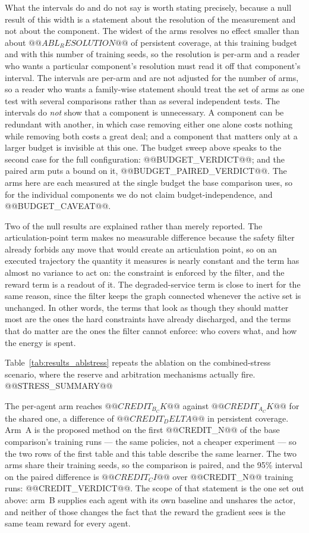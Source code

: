 What the intervals do and do not say is worth stating precisely, because a
null result of this width is a statement about the resolution of the
measurement and not about the component.  The widest of the arms resolves no effect smaller than about $@@ABL_RESOLUTION@@$ of persistent coverage, at this training budget and with this number of training seeds, so the resolution is per-arm and a reader who wants a particular component's resolution must read it off that component's interval.  The
intervals are per-arm and are not adjusted for the number of arms, so a
reader who wants a family-wise statement should treat the set of arms as
one test with several comparisons rather than as several independent
tests.  The intervals do \emph{not} show that a component is unnecessary.
A component can be redundant with another, in which case removing either
one alone costs nothing while removing both costs a great deal; and a
component that matters only at a larger budget is invisible at this one.
The budget sweep above speaks to the second case for the full
configuration: @@BUDGET_VERDICT@@; and the paired arm puts a bound on it,
@@BUDGET_PAIRED_VERDICT@@.  The arms
here are each measured at the single budget the base comparison uses, so
for the individual components we do not claim budget-independence, and
@@BUDGET_CAVEAT@@.

Two of the null results are explained rather than merely reported.  The
articulation-point term makes no measurable difference because the safety
filter already forbids any move that would create an articulation point, so
on an executed trajectory the quantity it measures is nearly constant and
the term has almost no variance to act on: the constraint is enforced by the
filter, and the reward term is a readout of it.  The degraded-service term
is close to inert for the same reason, since the filter keeps the graph
connected whenever the active set is unchanged.  In other words, the terms
that look as though they should matter most are the ones the hard
constraints have already discharged, and the terms that do matter are the
ones the filter cannot enforce: who covers what, and how the energy is
spent.


Table~\ref{tab:results_ablstress} repeats the ablation on the combined-stress scenario, where the reserve and arbitration mechanisms actually fire. @@STRESS_SUMMARY@@


The per-agent arm reaches $@@CREDIT_B_CK@@$ against $@@CREDIT_A_CK@@$ for
the shared one, a difference of $@@CREDIT_DELTA@@$ in persistent coverage.
Arm~A is the proposed method on the first @@CREDIT_N@@ of the base
comparison's training runs --- the same policies, not a cheaper experiment
--- so the two rows of the first table and this table describe the same
learner.
The two arms share their training seeds, so the comparison is paired, and
the 95\% interval on the paired difference is $@@CREDIT_CI@@$ over
@@CREDIT_N@@ training runs: @@CREDIT_VERDICT@@.  The scope of that
statement is the one set out above: arm~B
supplies each agent with its own baseline and unshares the actor, and
neither of those changes the fact that the reward the gradient sees is the
same team reward for every agent.

